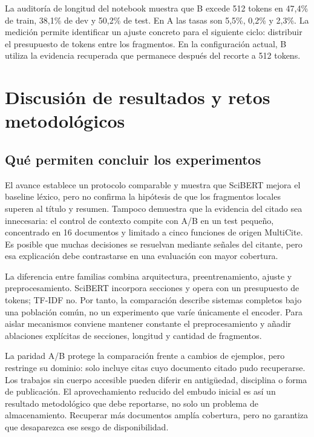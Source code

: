 \documentclass[10pt,a4paper,twocolumn]{article}
\begin{document}
La auditoría de longitud del notebook muestra que B excede 512 tokens en 47,4\% de train, 38,1\% de dev y 50,2\% de test. En A las tasas son 5,5\%, 0,2\% y 2,3\%. La medición permite identificar un ajuste concreto para el siguiente ciclo: distribuir el presupuesto de tokens entre los fragmentos. En la configuración actual, B utiliza la evidencia recuperada que permanece después del recorte a 512 tokens.

\section{Discusión de resultados y retos metodológicos}
\subsection{Qué permiten concluir los experimentos}
El avance establece un protocolo comparable y muestra que SciBERT mejora el baseline léxico, pero no confirma la hipótesis de que los fragmentos locales superen al título y resumen. Tampoco demuestra que la evidencia del citado sea innecesaria: el control de contexto compite con A/B en un test pequeño, concentrado en 16 documentos y limitado a cinco funciones de origen MultiCite. Es posible que muchas decisiones se resuelvan mediante señales del citante, pero esa explicación debe contrastarse en una evaluación con mayor cobertura.

La diferencia entre familias combina arquitectura, preentrenamiento, ajuste y preprocesamiento. SciBERT incorpora secciones y opera con un presupuesto de tokens; TF-IDF no. Por tanto, la comparación describe sistemas completos bajo una población común, no un experimento que varíe únicamente el encoder. Para aislar mecanismos conviene mantener constante el preprocesamiento y añadir ablaciones explícitas de secciones, longitud y cantidad de fragmentos.

La paridad A/B protege la comparación frente a cambios de ejemplos, pero restringe su dominio: solo incluye citas cuyo documento citado pudo recuperarse. Los trabajos sin cuerpo accesible pueden diferir en antigüedad, disciplina o forma de publicación. El aprovechamiento reducido del embudo inicial es así un resultado metodológico que debe reportarse, no solo un problema de almacenamiento. Recuperar más documentos amplía cobertura, pero no garantiza que desaparezca ese sesgo de disponibilidad.
\end{document}
